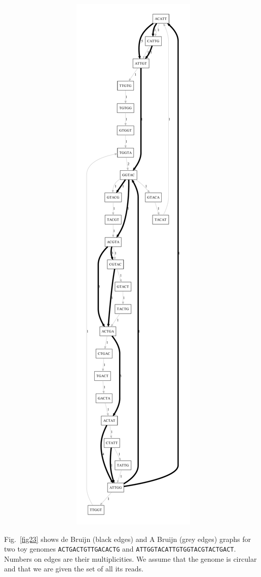 \documentclass[12pt]{article}
\begin{document}
\begin{figure}
\begin{center}
~~~~~~~~~~~~~~
\includegraphics[height=0.5\textheight]{fig3.pdf}\end{center}
\end{figure}

Fig.~\ref{fig23} shows de Bruijn (black edges) and A Bruijn (grey edges) graphs for two toy genomes 
{\tt ACTGACTGTTGACACTG} and {\tt ATTGGTACATTGTGGTACGTACTGACT}. Numbers on edges are their multiplicities. 
We assume that the genome is circular and that we are given the set of all its reads.
\end{document}
